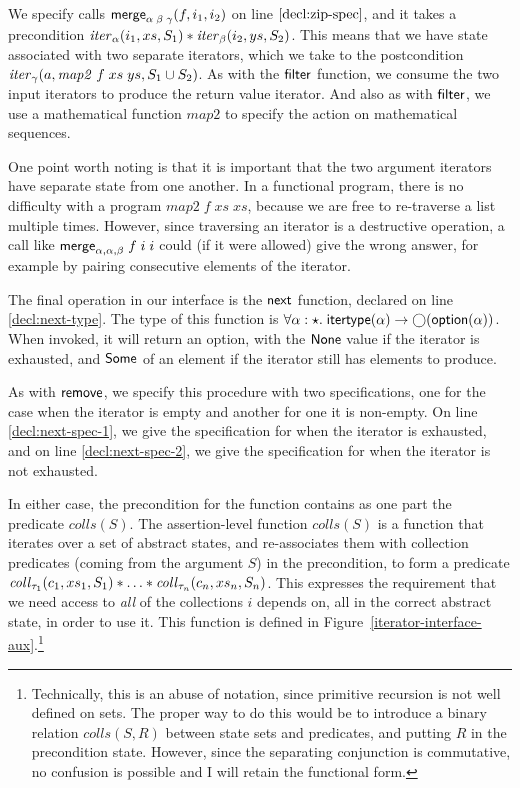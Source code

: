 We specify calls $\mathsf{merge}_{\alpha\;\beta\;\gamma}(f, i_1, i_2)$ on line
$\ref{decl:zip-spec}$, and it takes a precondition
$\mathit{iter}_\alpha(i_1, xs, S_1) * \mathit{iter}_\beta(i_2, ys, S_2)$.
This means that we have state associated with two separate iterators,
which we take to the postcondition $\mathit{iter}_{\gamma}(a,
\mathit{map2}\;f\;xs\;ys, S_1 \cup S_2)$. As with the $\mathsf{filter}$ function, 
we consume the two input iterators to produce the return value iterator. 
And also as with $\mathsf{filter}$, we use a mathematical function $\mathit{map2}$
to specify the action on mathematical sequences. 

One point worth noting is that it is important that the two argument
iterators have separate state from one another. In a functional
program, there is no difficulty with a program
$\mathit{map2}\;f\;xs\;xs$, because we are free to re-traverse a list
multiple times. However, since traversing an iterator is a destructive
operation, a call like $\mathsf{merge}_{\alpha,\alpha,\beta}\;f\;i\;i$
could (if it were allowed) give the wrong answer, for example by
pairing consecutive elements of the iterator.

The final operation in our interface is the $\mathsf{next}$ function,
declared on line \ref{decl:next-type}. The type of this function
is $\forall \alpha:\star.\; \mathsf{itertype}(\alpha) \to
\bigcirc{(\mathsf{option }{(\alpha)})}$.  When invoked, it will return an
option, with the $\mathsf{None}$ value if the iterator is exhausted,
and $\mathsf{Some}$ of an element if the iterator still has elements to
produce.

As with $\mathsf{remove}$, we specify this procedure with two
specifications, one for the case when the iterator is empty and
another for one it is non-empty. On line \ref{decl:next-spec-1}, we
give the specification for when the iterator is exhausted, and
on line \ref{decl:next-spec-2}, we give the specification for when
the iterator is not exhausted.  

In either case, the precondition for the function contains as one part
the predicate $\mathit{colls}(S)$.  The assertion-level function
$\mathit{colls}(S)$ is a function that iterates over a set of abstract
states, and re-associates them with collection predicates (coming from
the argument $S$) in the precondition, to form a predicate
$\mathit{coll}_{\tau_1}(c_1, xs_1, S_1) * \ldots * \mathit{coll}_{\tau_n}(c_n,
xs_n, S_n)$.  This expresses the requirement that we need access to
\emph{all} of the collections $i$ depends on, all in the correct
abstract state, in order to use it. 
This function is defined in
Figure~\ref{iterator-interface-aux}.\footnote{Technically, this is an
  abuse of notation, since primitive recursion is not well defined on
  sets.  The proper way to do this would be to introduce a binary
  relation $\mathit{colls(S, R)}$ between state sets and predicates,
  and putting $R$ in the precondition state. However, since the
  separating conjunction is commutative, no confusion is possible and
  I will retain the functional form.}

